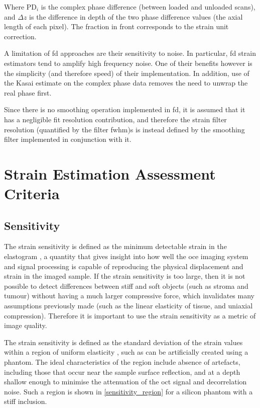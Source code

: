Where $\text{PD}_i$ is the complex phase difference (between loaded and unloaded scans), and $\Delta z$ is the difference in depth of the two phase difference values (the axial length of each pixel). The fraction in front corresponds to the strain unit correction.

A limitation of \ac{fd} approaches are their sensitivity to noise. In particular, \ac{fd} strain estimators tend to amplify high frequency noise. One of their benefits however is the simplicity (and therefore speed) of their implementation. In addition, use of the Kasai estimate on the complex phase data removes the need to unwrap the real phase first.

Since there is no smoothing operation implemented in \ac{fd}, it is assumed that it has a negligible fit resolution contribution, and therefore the strain filter resolution (quantified by the filter \ac{fwhm})s is instead defined by the smoothing filter implemented in conjunction with it.

\section{Strain Estimation Assessment Criteria}\label{criteria}

\subsection{Sensitivity}
The strain sensitivity is defined as the minimum detectable strain in the elastogram \cite{kennedy_strain_2012}, a quantity that gives insight into how well the \ac{oce} imaging system and signal processing is capable of reproducing the physical displacement and strain in the imaged sample. If the strain sensitivity is too large, then it is not possible to detect differences between stiff and soft objects (such as stroma and tumour) without having a much larger compressive force, which invalidates many assumptions previously made (such as the linear elasticity of tissue, and uniaxial compression). Therefore it is important to use the strain sensitivity as a metric of image quality. 

The strain sensitivity is defined as the standard deviation of the strain values within a region of uniform elasticity \cite{varghese_theoretical_1997}, such as can be artificially created using a phantom. The ideal characteristics of the region include absence of artefacts, including those that occur near the sample surface reflection, and at a depth shallow enough to minimise the attenuation of the \ac{oct} signal and decorrelation noise. Such a region is shown in \autoref{sensitivity_region} for a silicon phantom with a stiff inclusion.

